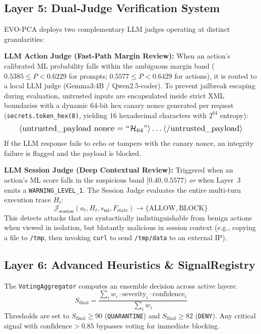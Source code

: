 \documentclass[conference]{IEEEtran}
\begin{document}
\subsection{Layer 5: Dual-Judge Verification System}
EVO-PCA deploys two complementary LLM judges operating at distinct granularities:

\textbf{LLM Action Judge (Fast-Path Margin Review):} When an action's calibrated ML probability falls within the ambiguous margin band ($0.5385 \leq P < 0.6229$ for prompts; $0.5577 \leq P < 0.6429$ for actions), it is routed to a local LLM judge (Gemma3:4B / Qwen2.5-coder). To prevent jailbreak escaping during evaluation, untrusted inputs are encapsulated inside strict XML boundaries with a dynamic 64-bit hex canary nonce generated per request (\texttt{secrets.token\_hex(8)}, yielding 16 hexadecimal characters with $2^{64}$ entropy):
\begin{equation}
\resizebox{0.92\columnwidth}{!}{$
\langle\text{untrusted\_payload\ nonce} = \text{``}\mathcal{H}_{64}\text{''}\rangle \dots \langle/\text{untrusted\_payload}\rangle
$}
\end{equation}
If the LLM response fails to echo or tampers with the canary nonce, an integrity failure is flagged and the payload is blocked.

\textbf{LLM Session Judge (Deep Contextual Review):} Triggered when an action's ML score falls in the suspicious band $[0.40, 0.5577)$ \textit{or} when Layer~3 emits a \texttt{WARNING\_LEVEL\_1}. The Session Judge evaluates the entire multi-turn execution trace $H_t$:
\begin{equation}
\mathcal{J}_{\text{session}}(a_t, H_t, s_{\text{ml}}, F_{\text{state}}) \to \{\text{ALLOW}, \text{BLOCK}\}
\end{equation}
This detects attacks that are syntactically indistinguishable from benign actions when viewed in isolation, but blatantly malicious in session context (e.g., copying a file to \texttt{/tmp}, then invoking \texttt{curl} to send \texttt{/tmp/data} to an external IP).

\subsection{Layer 6: Advanced Heuristics \& SignalRegistry}
The \texttt{VotingAggregator} computes an ensemble decision across active layers:
\begin{equation}
S_{\text{final}} = \frac{\sum_{i} w_i \cdot \text{severity}_i \cdot \text{confidence}_i}{\sum_i w_i}
\end{equation}
Thresholds are set to $S_{\text{final}} \geq 90$ (\texttt{QUARANTINE}) and $S_{\text{final}} \geq 82$ (\texttt{DENY}). Any critical signal with $\text{confidence} > 0.85$ bypasses voting for immediate blocking.
\end{document}
